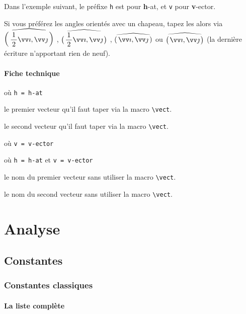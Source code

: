 \documentclass[12pt,a4paper]{article}
\theoremstyle{definition}
\begin{document}
Dans l'exemple suivant, le préfixe \verb+h+ est pour \textbf{h}-at, et \verb+v+ pour \textbf{v}-ector.

\begin{tcblisting}{}
Si vous préférez les angles orientés avec un chapeau, tapez les alors via
$\displaystyle \hangleorient{\frac{1}{2} \vect{i}}{\vect{j}}$ ,
$\displaystyle \hangleorient*{\frac{1}{2} \vect{i}}{\vect{j}}$ ,
$\displaystyle \hvangleorient{i}{j}$
ou
$\displaystyle \hvangleorient*{i}{j}$ (la dernière écriture n'apportant rien de neuf).
\end{tcblisting}



\paragraph{Fiche technique}


  où \quad \verb+h = h-at+

 le premier vecteur qu'il faut taper via la macro \verb+\vect+.

 le second vecteur qu'il faut taper via la macro \verb+\vect+.


\bigskip


 où \quad \verb+v = v-ector+

 où \quad \verb+h = h-at+ et \verb+v = v-ector+

 le nom du premier vecteur sans utiliser la macro \verb+\vect+.

 le nom du second vecteur sans utiliser la macro \verb+\vect+.




\section{Analyse}

\subsection{Constantes}

\subsubsection{Constantes classiques}

\paragraph{La liste complète}
\end{document}

